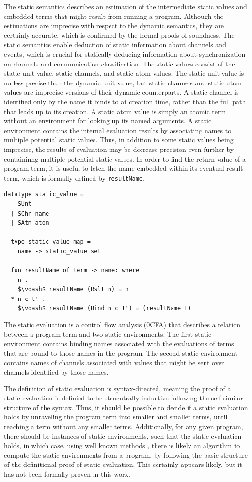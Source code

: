 \documentclass[letterpaper, 11pt]{extarticle}
\begin{document}
The static semantics describes an estimation of the intermediate static values and embedded terms
that might result from running a program.  Although the estimations are imprecise with
respect to the dynamic semantics, they are certainly accurate,
which is confirmed by the formal proofs of soundness.
The static semantics enable deduction of static information about channels and events, which is
crucial for statically deducing information about synchronization on channels and
communication classification.
The static values consist of the static unit value, static channels, and static atom
values. The static unit value is no less precise than the dynamic unit value, but
static channels and static atom values are imprecise versions of their dynamic
counterparts. A static channel is identified only by the name it binds to at creation time,
rather than the full path that leads up to its creation.  A static atom value is simply an
atomic term without an environment for looking up its named arguments.  A static
environment contains the internal evaluation results by
associating names to multiple potential static values.
Thus, in addition to some static values being imprecise,
the results of evaluation may be decrease precision even further
by containinng multiple potential static values. 
In order to find the return value of a program term, it is useful to fetch the name
embedded within its eventual result term, which is formally defined by \lstinline{resultName}.

\begin{lstlisting}[language=logic, mathescape]
  datatype static_value =
    SUnt
  | SChn name
  | SAtm atom 

  type static_value_map =
    name -> static_value set

  fun resultName of term -> name: where
    n .
    $\vdash$ resultName (Rslt n) = n
  * n c t' . 
    $\vdash$ resultName (Bind n c t') = (resultName t)
\end{lstlisting}

The static evaluation is a control flow analysis (0CFA)
that describes a relation between a program term and two static environments.
The first static environment contains binding names associated with the
evaluations of terms that are bound to those names in the program.
The second static environment contains names of channels associated
with values that might be sent over channels identified by those names.

The definition of static evaluation is syntax-directed, meaning the proof of a static evaluation
is definied to be strucutrally inductive following the self-similar structure of the syntax.
Thus, it should be possible to decide if a static evaluation holds
by unraveling the program term into smaller and smaller terms,
until reaching a term without any smaller terms.
Additionally, for any given program, there should be instances of static environments,
such that the static evaluation holds, in which case, using well known methods \cite{},
there is likely an algorithm to compute the static environments from a program,
by following the basic structure of the definitional proof of static evaluation.
This certainly appears likely, but it has not been formally proven in this work.
\end{document}
